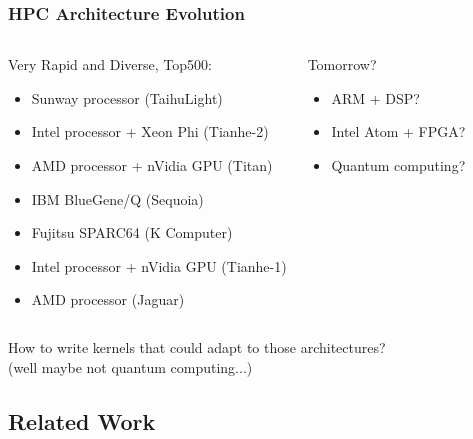 \documentclass{beamer}
\begin{document}
\begin{frame}
  \frametitle{HPC Architecture Evolution}

  \begin{columns}

  \begin{block}{\footnotesize Very Rapid and Diverse, Top500:}
    \begin{itemize}
      \item \scriptsize Sunway processor (TaihuLight)
      \item \scriptsize Intel processor + Xeon Phi (Tianhe-2)
      \item \scriptsize AMD processor + nVidia GPU (Titan)
      \item \scriptsize IBM BlueGene/Q (Sequoia)
      \item \scriptsize Fujitsu SPARC64 (K Computer)
      \item \scriptsize Intel processor + nVidia GPU (Tianhe-1)
      \item \scriptsize AMD processor (Jaguar)
    \end{itemize}
  \end{block}

  \begin{block}{\footnotesize Tomorrow?}
    \begin{itemize}
      \item \scriptsize ARM + DSP?
      \item \scriptsize Intel Atom + FPGA?
      \item \scriptsize Quantum computing?
    \end{itemize}
  \end{block}

  \end{columns}

  \vspace{1cm}
  How to write kernels that could adapt to those architectures?\\
  (well maybe not quantum computing...)

\end{frame}

\subsection{Related Work}
\end{document}

